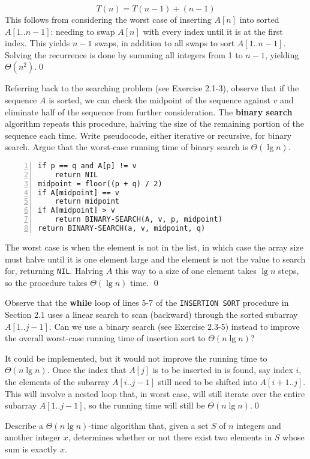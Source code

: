 \sol $$T(n) = T(n-1) + (n-1)$$
This follows from considering the worst case of inserting $A[n]$ into sorted $A[1..n-1]$: needing to swap $A[n]$ with every index until it is at the first index. This yields $n-1$ swaps, in addition to all swaps to sort $A[1..n-1]$. Solving the recurrence is done by summing all integers from 1 to $n-1$, yielding $\Theta(n^2)$.\qed

 Referring back to the searching problem (see Exercise 2.1-3), observe that if the sequence $A$ is sorted, we can check the midpoint of the sequence against $v$ and eliminate half of the sequence from further consideration. The \textbf{binary search} algorithm repeats this procedure, halving the size of the remaining portion of the sequence each time. Write pseudocode, either iterative or recursive, for binary search. Argue that the worst-case running time of binary search is $\Theta(\lg n)$.

\sol \begin{Verbatim}[frame=single,numbers=left,samepage=true,label={BINARY-SEARCH(A, v, p, q)}]
if p == q and A[p] != v
    return NIL
midpoint = floor((p + q) / 2)
if A[midpoint] == v
    return midpoint
if A[midpoint] > v
    return BINARY-SEARCH(A, v, p, midpoint)
return BINARY-SEARCH(a, v, midpoint, q)
\end{Verbatim}
The worst case is when the element is not in the list, in which case the array size must halve until it is one element large and the element is not the value to search for, returning \verb|NIL|. Halving $A$ this way to a size of one element takes $\lg n$ steps, so the procedure takes $\Theta(\lg n)$ time.
\qed

 Observe that the \textbf{while} loop of lines 5-7 of the \verb|INSERTION SORT| procedure in Section 2.1 uses a linear search to scan (backward) through the sorted subarray $A[1..j-1]$. Can we use a binary search (see Exercise 2.3-5) instead to improve the overall worst-case running time of insertion sort to $\Theta(n \lg n)$?

\sol It could be implemented, but it would not improve the running time to $\Theta(n \lg n)$. Once the index that $A[j]$ is to be inserted in is found, say index $i$, the elements of the subarray $A[i..j-1]$ still need to be shifted into $A[i+1..j]$. This will involve a nested loop that, in worst case, will still iterate over the entire subarray $A[1..j-1]$, so the running time will still be $\Theta(n \lg n)$.\qed

 Describe a $\Theta(n \lg n)$-time algorithm that, given a set $S$ of $n$ integers and another integer $x$, determines whether or not there exist two elements in $S$ whose sum is exactly $x$.

